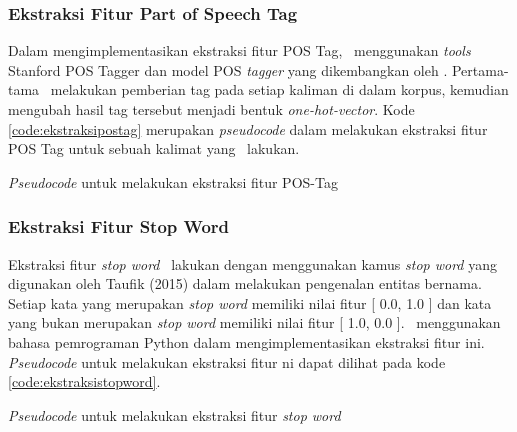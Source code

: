\subsubsection{Ekstraksi Fitur Part of Speech Tag}
Dalam mengimplementasikan ekstraksi fitur POS Tag, \saya~menggunakan \textit{tools} Stanford POS Tagger \citep{toutanova2000enriching} dan model POS \textit{tagger} yang dikembangkan oleh \cite{dinakaramani2014designing}. Pertama-tama \saya~melakukan pemberian tag pada setiap kaliman di dalam korpus, kemudian mengubah hasil tag tersebut menjadi bentuk \textit{one-hot-vector}. Kode \ref{code:ekstraksipostag} merupakan \textit{pseudocode} dalam melakukan ekstraksi fitur POS Tag untuk sebuah kalimat yang \saya~lakukan.

\begin{kode}
	
	
	\caption{\textit{Pseudocode} untuk melakukan ekstraksi fitur POS-Tag}
	\label{code:ekstraksipostag}
\end{kode}

\subsubsection{Ekstraksi Fitur Stop Word}
Ekstraksi fitur \textit{stop word} \saya~lakukan dengan menggunakan kamus \textit{stop word} yang digunakan oleh Taufik (2015) dalam melakukan pengenalan entitas bernama. Setiap kata yang merupakan \textit{stop word} memiliki nilai fitur [ 0.0, 1.0 ] dan kata yang bukan merupakan \textit{stop word} memiliki nilai fitur [ 1.0, 0.0 ]. \Saya~menggunakan bahasa pemrograman Python dalam mengimplementasikan ekstraksi fitur ini.
\textit{Pseudocode} untuk melakukan ekstraksi fitur ni dapat dilihat pada kode \ref{code:ekstraksistopword}.

\begin{kode}

	
	
	\caption{\textit{Pseudocode} untuk melakukan ekstraksi fitur \textit{stop word}}
	\label{code:ekstraksistopword}	
\end{kode}

